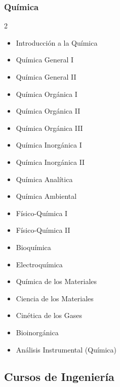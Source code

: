 \documentclass[12pt,a4paper]{article}
\begin{document}
	\subsubsection{Química}
	\begin{multicols}{2}
		\begin{itemize}
			\item Introducción a la Química
			\item Química General I
			\item Química General II
			\item Química Orgánica I
			\item Química Orgánica II
			\item Química Orgánica III
			\item Química Inorgánica I
			\item Química Inorgánica II
			\item Química Analítica
			\item Química Ambiental
			\item Físico-Química I
			\item Físico-Química II
			\item Bioquímica
			\item Electroquímica
			\item Química de los Materiales
			\item Ciencia de los Materiales
			\item Cinética de los Gases
			\item Bioinorgánica
			\item Análisis Instrumental (Química)
		\end{itemize}
	\end{multicols}
	
	\subsection{Cursos de Ingeniería}
	
\end{document}
